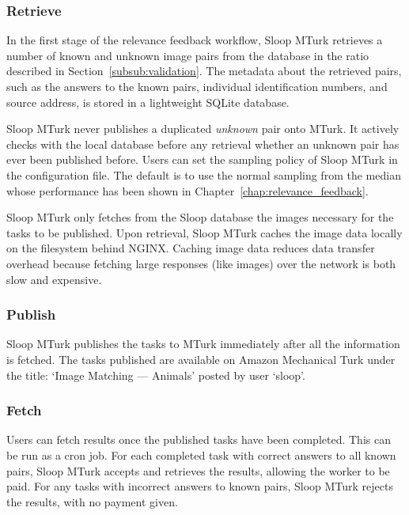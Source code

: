 \subsubsection{Retrieve}

In the first stage of the relevance feedback workflow, Sloop MTurk retrieves a
number of known and unknown image pairs from the database in the ratio
described in Section~\ref{subsub:validation}. The metadata about the retrieved
pairs, such as the answers to the known pairs, individual identification
numbers, and source address, is stored in a lightweight SQLite database.

Sloop MTurk never publishes a duplicated \emph{unknown} pair onto MTurk. It
actively checks with the local database before any retrieval whether an unknown pair
has ever been published before. Users can set the sampling policy of Sloop MTurk in
the configuration file. The default is to use the normal sampling from the
median whose performance has been shown in
Chapter~\ref{chap:relevance_feedback}.

Sloop MTurk only fetches from the Sloop database the images necessary for the
tasks to be published.  Upon retrieval, Sloop MTurk caches the image data
locally on the filesystem behind NGINX\@. Caching image data reduces data transfer
overhead because fetching large responses (like images) over the network is
both slow and expensive.

\subsubsection{Publish}

Sloop MTurk publishes the tasks to MTurk immediately after all the
information is fetched. The tasks published are available on Amazon Mechanical
Turk under the title: `Image Matching --- Animals' posted by user `sloop'.

\subsubsection{Fetch}

Users can fetch results once the published tasks have been completed. This can
be run as a cron job.  For each completed task with correct answers to all
known pairs, Sloop MTurk accepts and retrieves the results, allowing the worker
to be paid.  For any tasks with incorrect answers to known pairs, Sloop MTurk
rejects the results, with no payment given.


